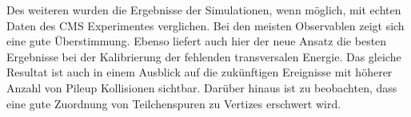 Des weiteren wurden die Ergebnisse der Simulationen, wenn m\"o{}glich, mit echten Daten des CMS Experimentes verglichen. Bei den meisten Observablen zeigt sich eine gute \"U{}berstimmung. Ebenso liefert auch hier der neue Ansatz die besten Ergebnisse bei der Kalibrierung der fehlenden transversalen Energie. Das gleiche Resultat ist auch in einem Ausblick auf die zuk\"u{}nftigen Ereignisse mit h\"o{}herer Anzahl von Pileup Kollisionen sichtbar. Dar\"u{}ber hinaus ist zu beobachten, dass eine gute Zuordnung von Teilchenspuren zu Vertizes erschwert wird.

